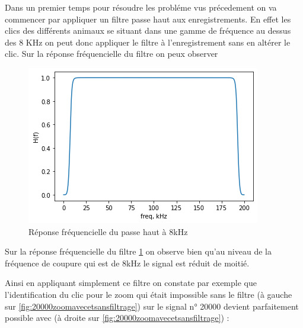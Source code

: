 Dans un premier temps pour résoudre les probléme vus précedement on  va commencer par appliquer un filtre passe haut aux enregistrements. En effet les clics des différents animaux se situant dans une gamme de fréquence au dessus des 8 KHz on peut donc appliquer le filtre à l'enregistrement sans en altérer le clic.
Sur la réponse fréquencielle du filtre on peux observer
\begin{figure}[!h]
\centering
\includegraphics[width=\textwidth]{./images/reponseEnFrequencePH8kHz.png}
\caption{Réponse fréquencielle du passe haut à 8kHz%
\label{fig:reponseEnFrequencePH8kHz}}
\end{figure}
Sur la réponse fréquencielle du filtre \ref{fig:reponseEnFrequencePH8kHz} on observe bien qu'au niveau de la fréquence de coupure qui est de 8kHz le signal est réduit de moitié.

Ainsi en appliquant simplement ce filtre on constate par exemple que l'identification du clic pour le zoom qui était impossible sans le filtre (à gauche sur \ref{fig:20000zoomavecetsansfiltrage}) sur le signal n° 20000 devient parfaitement possible avec (à droite sur \ref{fig:20000zoomavecetsansfiltrage}) :

